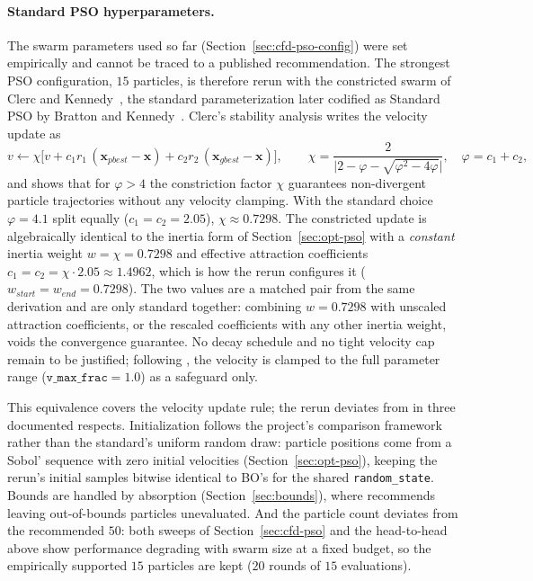 \paragraph{Standard PSO hyperparameters.}
The swarm parameters used so far (Section~\ref{sec:cfd-pso-config}) were
set empirically and cannot be traced to a published recommendation.  The
strongest PSO configuration, $15$ particles, is therefore rerun with the
constricted swarm of Clerc and Kennedy~\cite{clerc2002}, the standard
parameterization later codified as Standard PSO by Bratton and
Kennedy~\cite{bratton2007}.  Clerc's stability analysis writes the
velocity update as
\[
v \leftarrow \chi \bigl[ v
  + c_1 r_1 \,(\mathbf{x}_{pbest} - \mathbf{x})
  + c_2 r_2 \,(\mathbf{x}_{gbest} - \mathbf{x}) \bigr],
\qquad
\chi = \frac{2}{\bigl| 2 - \varphi - \sqrt{\varphi^2 - 4\varphi} \bigr|},
\quad \varphi = c_1 + c_2,
\]
and shows that for $\varphi > 4$ the constriction factor $\chi$
guarantees non-divergent particle trajectories without any velocity
clamping.  With the standard choice $\varphi = 4.1$ split equally
($c_1 = c_2 = 2.05$), $\chi \approx 0.7298$.  The constricted update is
algebraically identical to the inertia form of
Section~\ref{sec:opt-pso} with a \emph{constant} inertia weight
$w = \chi = 0.7298$ and effective attraction coefficients
$c_1 = c_2 = \chi \cdot 2.05 \approx 1.4962$, which is how the rerun
configures it ($w_{start} = w_{end} = 0.7298$).  The two values are a
matched pair from the same derivation and are only standard together:
combining $w = 0.7298$ with unscaled attraction coefficients, or the
rescaled coefficients with any other inertia weight, voids the
convergence guarantee.  No decay schedule and no tight velocity cap
remain to be justified; following \cite{bratton2007}, the velocity is
clamped to the full parameter range ($\texttt{v\_max\_frac} = 1.0$) as a
safeguard only.

This equivalence covers the velocity update rule; the rerun deviates
from \cite{bratton2007} in three documented respects.  Initialization
follows the project's comparison framework rather than the standard's
uniform random draw: particle positions come from a Sobol' sequence with
zero initial velocities (Section~\ref{sec:opt-pso}), keeping the rerun's
initial samples bitwise identical to BO's for the shared
\texttt{random\_state}.  Bounds are handled by absorption
(Section~\ref{sec:bounds}), where \cite{bratton2007} recommends leaving
out-of-bounds particles unevaluated.  And the particle count deviates
from the recommended $50$: both sweeps of Section~\ref{sec:cfd-pso} and
the head-to-head above show performance degrading with swarm size at a
fixed budget, so the empirically supported $15$ particles are kept
($20$ rounds of $15$ evaluations).

